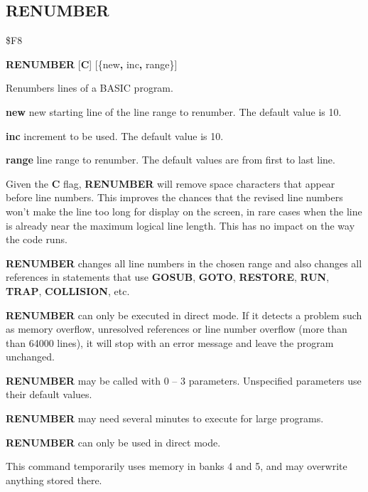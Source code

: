 \subsection{RENUMBER}
\begin{description}[leftmargin=2cm,style=nextline]
\item [Token:] \$F8
\item [Format:] {\bf RENUMBER} [{\bf C}] [\{new{\bf,} inc{\bf,} range\}]
\item [Usage:] Renumbers lines of a BASIC program.

               {\bf new} new starting line of the
               line range to renumber.
               The default value is 10.

               {\bf inc} increment to be used.
               The default value is 10.

               {\bf range} line range to renumber.
               The default values are from first to last line.

               Given the {\bf C} flag, {\bf RENUMBER} will remove space characters that appear before line numbers. This improves the chances that the revised line numbers won't make the line too long for display on the screen, in rare cases when the line is already near the maximum logical line length. This has no impact on the way the code runs.

               {\bf RENUMBER} changes all line numbers in
               the chosen range and also changes all references
               in statements that use {\bf GOSUB}, {\bf GOTO},
               {\bf RESTORE}, {\bf RUN}, {\bf TRAP}, {\bf COLLISION}, etc.

               {\bf RENUMBER} can only be executed in direct mode.
               If it detects a problem such as memory overflow,
               unresolved references or line number overflow
               (more than than 64000 lines), it will stop with an error
               message and leave the program unchanged.

               {\bf RENUMBER} may be called with 0 -- 3 parameters.
               Unspecified parameters use their default values.

\item [Remarks:] {\bf RENUMBER} may need several
                 minutes to execute for large programs.

                 {\bf RENUMBER} can only be used in direct mode.

                 This command temporarily uses memory in banks 4 and 5, and
                 may overwrite anything stored there.


\end{description}
